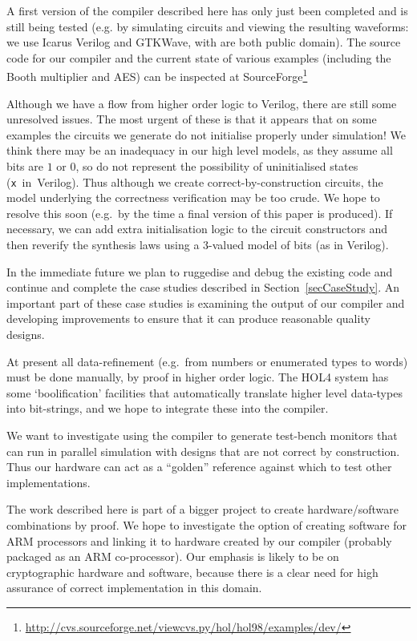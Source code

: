 

A first version of the compiler described here has only just been
completed and is still being tested (e.g. by simulating circuits and
viewing the resulting waveforms: we use Icarus Verilog and GTKWave,
with are both public domain).  The source code for our compiler and
the current state of various examples (including the Booth multiplier
and AES) can be inspected at
SourceForge\footnote{\url{http://cvs.sourceforge.net/viewcvs.py/hol/hol98/examples/dev/}}

Although we have a flow from higher
order logic to Verilog, there are still some unresolved issues. The
most urgent of these is that it appears that on some examples the
circuits we generate do not initialise properly under simulation!  We
think there may be an inadequacy in our high level models, as they
assume all bits are $1$ or $0$, so do not represent the possibility of
uninitialised states (\texttt{x}~in~Verilog). Thus although we create
correct-by-construction circuits, the model underlying the correctness
verification may be too crude. We hope to resolve this soon (e.g.~by
the time a final version of this paper is produced). If necessary, we
can add extra initialisation logic to the circuit constructors and
then reverify the synthesis laws using a 3-valued model of bits
(as in Verilog).



In the immediate future we plan to ruggedise and debug the existing
code and continue and complete the case studies described in
Section~\ref{secCaseStudy}. An important part of these case studies is
examining the output of our compiler and developing improvements to
ensure that it can produce reasonable quality designs.

At present all data-refinement (e.g.~from numbers or enumerated types
to words) must be done manually, by proof in higher order logic. The
HOL4 system has some `boolification' facilities that automatically
translate higher level data-types into bit-strings, and we hope to
integrate these into the compiler.

We want to investigate using the compiler to generate test-bench
monitors that can run in parallel simulation with designs that are not
correct by construction.  Thus our hardware can act as a ``golden''
reference against which to test other implementations.

The work described here is part of a bigger project to create
hardware/software combinations by proof.  We hope to investigate the
option of creating software for ARM processors and linking it to
hardware created by our compiler (probably packaged as an ARM
co-processor). Our emphasis is likely to be on cryptographic hardware
and software, because there is a clear need for high assurance of
correct implementation in this domain.
